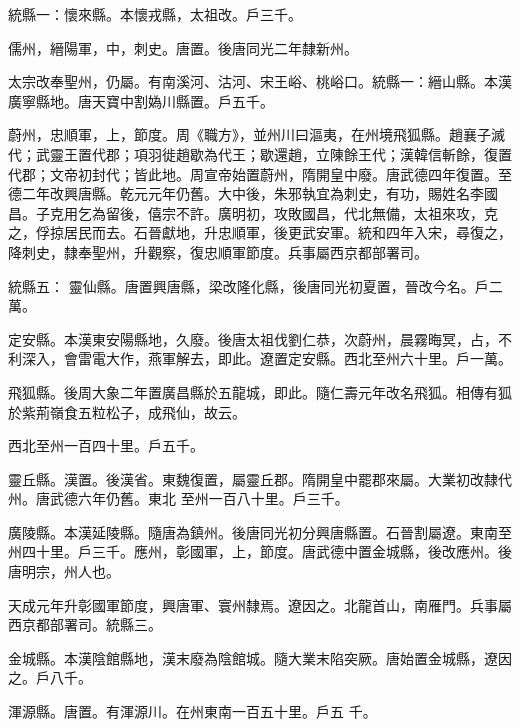\begin{pinyinscope}
 統縣一：懷來縣。本懷戎縣，太祖改。戶三千。



 儒州，縉陽軍，中，刺史。唐置。後唐同光二年隸新州。



 太宗改奉聖州，仍屬。有南溪河、沽河、宋王峪、桃峪口。統縣一：縉山縣。本漢廣寧縣地。唐天寶中割媯川縣置。戶五千。



 蔚州，忠順軍，上，節度。周《職方》，並州川曰漚夷，在州境飛狐縣。趙襄子滅代；武靈王置代郡；項羽徙趙歇為代王；歇還趙，立陳餘王代；漢韓信斬餘，復置代郡；文帝初封代；皆此地。周宣帝始置蔚州，隋開皇中廢。唐武德四年復置。至德二年改興唐縣。乾元元年仍舊。大中後，朱邪執宜為刺史，有功，賜姓名李國昌。子克用乞為留後，僖宗不許。廣明初，攻敗國昌，代北無備，太祖來攻，克之，俘掠居民而去。石晉獻地，升忠順軍，後更武安軍。統和四年入宋，尋復之，降刺史，隸奉聖州，升觀察，復忠順軍節度。兵事屬西京都部署司。



 統縣五：
 靈仙縣。唐置興唐縣，梁改隆化縣，後唐同光初夏置，晉改今名。戶二萬。



 定安縣。本漢東安陽縣地，久廢。後唐太祖伐劉仁恭，次蔚州，晨霧晦冥，占，不利深入，會雷電大作，燕軍解去，即此。遼置定安縣。西北至州六十里。戶一萬。



 飛狐縣。後周大象二年置廣昌縣於五龍城，即此。隨仁壽元年改名飛狐。相傳有狐於紫荊嶺食五粒松子，成飛仙，故云。



 西北至州一百四十里。戶五千。



 靈丘縣。漢置。後漢省。東魏復置，屬靈丘郡。隋開皇中罷郡來屬。大業初改隸代州。唐武德六年仍舊。東北
 至州一百八十里。戶三千。



 廣陵縣。本漢延陵縣。隨唐為鎮州。後唐同光初分興唐縣置。石晉割屬遼。東南至州四十里。戶三千。應州，彰國軍，上，節度。唐武德中置金城縣，後改應州。後唐明宗，州人也。



 天成元年升彰國軍節度，興唐軍、寰州隸焉。遼因之。北龍首山，南雁門。兵事屬西京都部署司。統縣三。



 金城縣。本漢陰館縣地，漢末廢為陰館城。隨大業末陷突厥。唐始置金城縣，遼因之。戶八千。



 渾源縣。唐置。有渾源川。在州東南一百五十里。戶五
 千。




\end{pinyinscope}
